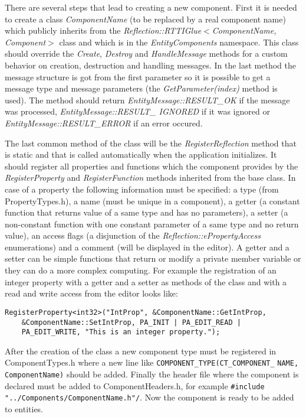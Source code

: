 There are several steps that lead to creating a new component. First it is needed to create a class \emph{ComponentName} (to be replaced by a real component name) which publicly inherits from the \emph{Reflection::RTTIGlue$<$Component\-Name, Component$>$} class and which is in the \emph{EntityComponents} namespace. This class should override the \emph{Create}, \emph{Destroy} and \emph{HandleMessage} methods for a custom behavior on creation, destruction and handling messages. In the last method the message structure is got from the first parameter so it is possible to get a message type and message parameters (the \emph{GetParameter(index)} method is used). The method should return \emph{EntityMessage::RESULT\_OK} if the message was processed, \emph{EntityMessage::RESULT\_ IGNORED} if it was ignored or \emph{EntityMessage::RESULT\_ERROR} if an error occured.

The last common method of the class will be the \emph{RegisterReflection} me\-thod that is static and that is called automatically when the application initializes. It should register all properties and functions which the component provides by the \emph{RegisterProperty} and \emph{RegisterFunction} methods inherited from the base class. In case of a property the following information must be specified: a type (from PropertyTypes.h), a name (must be unique in a component), a getter (a constant function that returns value of a same type and has no parameters), a setter (a non-constant function with one constant parameter of a same type and no return value), an access flags (a disjunction of the \emph{Reflection::ePropertyAccess} enumerations) and a comment (will be displayed in the editor). A getter and a setter can be simple functions that return or modify a private member variable or they can do a more complex computing. For example the registration of an integer property with a getter and a setter as methods of the class and with a read and write access from the editor looks like:
\begin{verbatim}
RegisterProperty<int32>("IntProp", &ComponentName::GetIntProp,
    &ComponentName::SetIntProp, PA_INIT | PA_EDIT_READ |
    PA_EDIT_WRITE, "This is an integer property.");
\end{verbatim}

After the creation of the class a new component type must be registered in ComponentTypes.h where a new line like \verb/COMPONENT_TYPE(CT_COMPONENT_/ \verb/NAME, ComponentName)/ should be added. Finally the header file where the component is declared must be added to ComponentHeaders.h, for example \verb|#include "../Components/ComponentName.h"/|. Now the component is ready to be added to entities.

